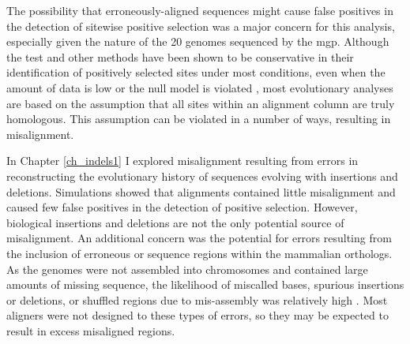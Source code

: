 The possibility that erroneously-aligned sequences might cause false
positives in the detection of sitewise positive selection was a major
concern for this analysis, especially given the \lcv nature of the 20
genomes sequenced by the \ac{mgp}. Although the \slr test and other
\sw \ml methods have been shown to be conservative in their
identification of positively selected sites under most conditions,
even when the amount of data is low or the null model is violated
\citep{Anisimova2002,Anisimova2003,Massingham2005}, most evolutionary
analyses are based on the assumption that all sites within an
alignment column are truly homologous. This assumption can be violated
in a number of ways, resulting in misalignment.

In Chapter \ref{ch_indels1} I explored misalignment resulting from
errors in reconstructing the evolutionary history of sequences
evolving with insertions and deletions. Simulations showed that
\prankc alignments contained little misalignment and caused few false
positives in the \sw detection of positive selection. However,
biological insertions and deletions are not the only potential source
of misalignment. An additional concern was the potential for errors
resulting from the inclusion of erroneous or \nhom sequence regions
within the mammalian orthologs. As the \lcv genomes were not assembled
into chromosomes and contained large amounts of missing sequence, the
likelihood of miscalled bases, spurious insertions or deletions, or
shuffled regions due to mis-assembly was relatively high
\citep{Green2007}. Most aligners were not designed to these types of
errors, so they may be expected to result in excess misaligned
regions.



